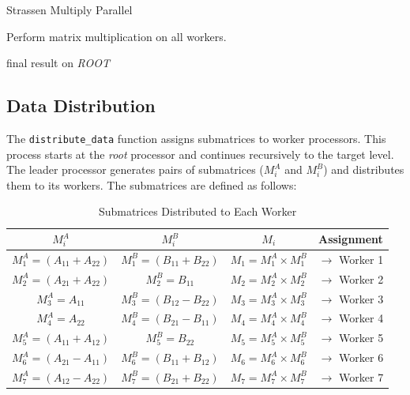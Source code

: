 \documentclass[12pt,a4paper]{article}
\begin{document}
 
\begin{algorithm}[htbp]
    \caption{Strassen Multiply Parallel}
    \label{alg:strassen_multiply_parallel}
    \begin{algorithmic}[1]

            \State {}  
        \EndFor
        
        \State Perform matrix multiplication on all workers.
        
            \State {}
        \EndFor
        
        \State \Return final result on \textit{ROOT}
    \EndProcedure
    \end{algorithmic}
\end{algorithm}

\subsection{Data Distribution}
The \texttt{distribute\_data} function assigns submatrices to worker processors. This process starts at the \textit{root} processor and continues recursively to the target level. The leader processor generates pairs of submatrices ($M^A_i$ and $M^B_i$) and distributes them to its workers. The submatrices are defined as follows:

\begin{table}[htbp]
    \centering
    \begin{tabular}{cccc}
        \toprule
        $M^A_i$ & $M^B_i$ & $M_i$ & Assignment \\
        \midrule
        $M^A_1 = (A_{11} + A_{22})$ & $M^B_1 = (B_{11} + B_{22})$ & $M_1 = M^A_1 \times M^B_1$ & $\rightarrow$ Worker 1 \\
        $M^A_2 = (A_{21} + A_{22})$ & $M^B_2 = B_{11}$ & $M_2 = M^A_2 \times M^B_2$ & $\rightarrow$ Worker 2 \\
        $M^A_3 = A_{11}$ & $M^B_3 = (B_{12} - B_{22})$ & $M_3 = M^A_3 \times M^B_3$ & $\rightarrow$ Worker 3 \\
        $M^A_4 = A_{22}$ & $M^B_4 = (B_{21} - B_{11})$ & $M_4 = M^A_4 \times M^B_4$ & $\rightarrow$ Worker 4 \\
        $M^A_5 = (A_{11} + A_{12})$ & $M^B_5 = B_{22}$ & $M_5 = M^A_5 \times M^B_5$ & $\rightarrow$ Worker 5 \\
        $M^A_6 = (A_{21} - A_{11})$ & $M^B_6 = (B_{11} + B_{12})$ & $M_6 = M^A_6 \times M^B_6$ & $\rightarrow$ Worker 6 \\
        $M^A_7 = (A_{12} - A_{22})$ & $M^B_7 = (B_{21} + B_{22})$ & $M_7 = M^A_7 \times M^B_7$ & $\rightarrow$ Worker 7 \\
        \bottomrule
    \end{tabular}
    \caption{Submatrices Distributed to Each Worker}
    \label{tab:submatrices}
\end{table}
\end{document}
